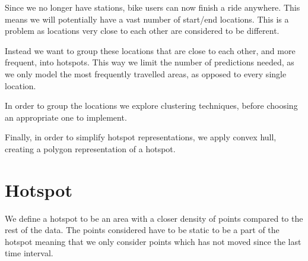 Since we no longer have stations, bike users can now finish a ride anywhere.
This means we will potentially have a vast number of start/end locations.
This is a problem as locations very close to each other are considered to be different.

Instead we want to group these locations that are close to each other, and more frequent, into hotspots.
This way we limit the number of predictions needed, as we only model the most frequently travelled areas, as opposed to every single location.

In order to group the locations we explore clustering techniques, before choosing an appropriate one to implement.

Finally, in order to simplify hotspot representations, we apply convex hull, creating a polygon representation of a hotspot.

\section{Hotspot}\label{hotspot}
We define a hotspot to be an area with a closer density of points compared to the rest of the data.
The points considered have to be static to be a part of the hotspot meaning that we only consider points which has not moved since the last time interval.